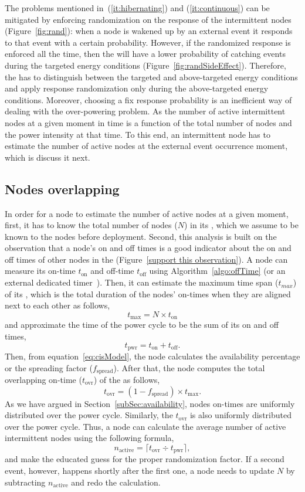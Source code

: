 The problems mentioned in~(\ref{it:hibernating}) and (\ref{it:continuous}) can be mitigated by enforcing randomization on the response of the intermittent nodes (Figure~\ref{fig:rand}): when a node is wakened up by an external event it responds to that event with a certain probability. However, if the randomized response is enforced all the time, then the \sys will have a lower probability of catching events during the targeted energy conditions (Figure~\ref{fig:randSideEffect}). Therefore, the \sys has to distinguish between the targeted and above-targeted energy conditions and apply response randomization only during the above-targeted energy conditions. Moreover, choosing a fix response probability is an inefficient way of dealing with the over-powering problem. As the number of active intermittent nodes at a given moment in time is a function of the total number of nodes and the power intensity at that time. To this end, an intermittent node has to estimate the number of active nodes at the external event occurrence moment, which is discuss it next.

\subsection{Nodes overlapping}
In order for a node to estimate the number of active nodes at a given moment, first, it has to know the total number of nodes ($N$) in its \sys, which we assume to be known to the nodes before deployment. Second, this analysis is built on the observation that a node's on and off times is a good indicator about the on and off times of other nodes in the \sys (Figure~\ref{support this observation}). A node can measure its on-time $t_\text{on}$ and off-time $t_\text{off}$ using  Algorithm~\ref{algo:offTime} (or an external dedicated timer~\cite{hester2017timely}). Then, it can estimate the maximum time span ($t_{max}$) of its \sys, which is the total duration of the nodes' on-times when they are aligned next to each other as follows,
$$
t_\text{max} = N\times t_\text{on}
$$
 and approximate the time of the \sys power cycle to be the sum of its on and off times,
$$
t_\text{pwr} = t_\text{on} + t_\text{off}.
$$
Then, from equation~\ref{eq:cisModel}, the node calculates the \sys availability percentage or the \sys spreading factor ($f_\text{spread}$). After that, the node computes the total overlapping on-time ($t_\text{ovr}$) of the \sys as follows,
$$
t_\text{ovr} = (1-f_\text{spread})\times t_\text{max}.
$$
As we have argued in Section~\ref{subSec:availability}, nodes on-times are uniformly distributed over the \sys power cycle. Similarly, the $t_\text{ovr}$ is also uniformly distributed over the \sys power cycle. Thus, a node can calculate the average number of active intermittent nodes using the following formula,
$$
n_\text{active}=\lceil{t_\text{ovr}\div t_\text{pwr}}\rceil,
$$
and make the educated guess for the proper randomization factor. If a second event, however, happens shortly after the first one, a node needs to update $N$ by subtracting $n_\text{active}$ and redo the calculation. 